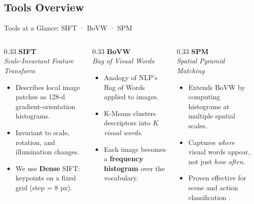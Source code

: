 \subsection{Tools Overview}
\begin{frame}{Tools at a Glance: SIFT · BoVW · SPM}
  \begin{columns}
    \begin{column}{0.33\textwidth}
      \textbf{SIFT}\\
      \textit{Scale-Invariant Feature Transform}
      \vspace{0.3em}
      \begin{itemize}
        \item Describes local image patches as 128-d gradient-orientation histograms.
        \item Invariant to scale, rotation, and illumination changes.
        \item We use \textbf{Dense} SIFT: keypoints on a fixed grid (step = 8 px).
      \end{itemize}
    \end{column}
    \begin{column}{0.33\textwidth}
      \textbf{BoVW}\\
      \textit{Bag of Visual Words}
      \vspace{0.3em}
      \begin{itemize}
        \item Analogy of NLP's Bag of Words applied to images.
        \item K-Means clusters descriptors into $K$ \emph{visual words}.
        \item Each image becomes a \textbf{frequency histogram} over the vocabulary.
      \end{itemize}
    \end{column}
    \begin{column}{0.33\textwidth}
      \textbf{SPM}\\
      \textit{Spatial Pyramid Matching}
      \vspace{0.3em}
      \begin{itemize}
        \item Extends BoVW by computing histograms at multiple spatial scales.
        \item Captures \emph{where} visual words appear, not just \emph{how often}.
        \item Proven effective for scene and action classification \cite{lazebnik2006}.
      \end{itemize}
    \end{column}
  \end{columns}
\end{frame}

